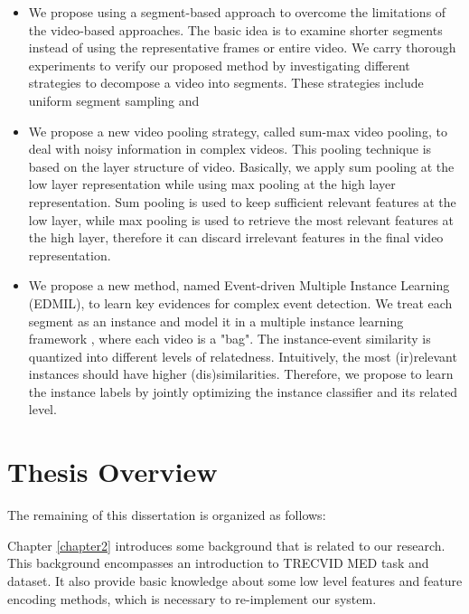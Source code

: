 \begin{itemize}
\item We propose using a segment-based approach to overcome the limitations of  the video-based approaches. The basic idea is to examine shorter segments instead of using the representative frames or entire video. We carry thorough experiments to verify our proposed method by investigating different strategies to decompose a video into segments. These strategies include uniform segment sampling and 

\item We propose a new video pooling strategy, called sum-max video pooling, to deal with noisy information in complex videos. This pooling technique is based on the layer structure of video. Basically, we apply sum pooling at the low layer representation while using max pooling at the high layer representation. Sum pooling is used to keep sufficient relevant features at the low layer, while max pooling is used to retrieve the most relevant features at the high layer, therefore it can discard irrelevant features in the final video representation. 
	
\item We propose a new method, named Event-driven Multiple Instance Learning (EDMIL), to learn key evidences for complex event detection. We treat each segment as an instance and model it in a multiple instance learning framework \cite{andrews2002support}, where each video is a "bag". The instance-event similarity is quantized into different levels of relatedness. Intuitively, the most (ir)relevant instances should have higher (dis)similarities. Therefore, we propose to learn the instance labels by jointly optimizing the instance classifier and its related level.
	
\end{itemize}

\section{Thesis Overview}


The remaining of this dissertation is organized as follows:

Chapter \ref{chapter2} introduces some background that is related to our research. This background encompasses an introduction to TRECVID MED task and dataset. It also provide basic knowledge about some low level features and feature encoding methods, which is necessary to re-implement our system. 

